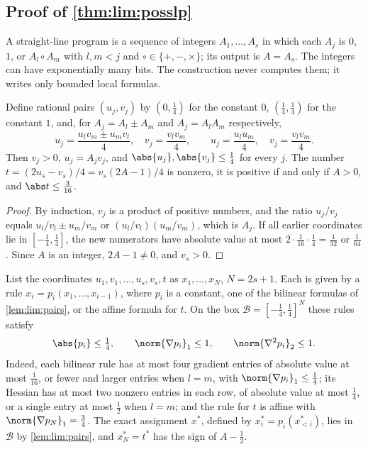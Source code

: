 \subsection{Proof of \texorpdfstring{\cref{thm:lim:posslp}}{the PosSLP theorem}}\label{app:lim:posslp}

A straight-line program is a sequence of integers $A_1,\ldots,A_s$ in which
each $A_j$ is $0$, $1$, or $A_l\circ A_m$ with $l,m<j$ and
$\circ\in\{+,-,\times\}$; its output is $A=A_s$. The integers can have
exponentially many bits. The construction never computes them; it writes
only bounded local formulas.

\begin{lemma}\label{lem:lim:pairs}
Define rational pairs $(u_j,v_j)$ by $(0,\frac14)$ for the constant $0$,
$(\frac14,\frac14)$ for the constant $1$, and, for $A_j=A_l\pm A_m$ and
$A_j=A_lA_m$ respectively,
\[
 u_j=\frac{u_lv_m\pm u_mv_l}4,\quad v_j=\frac{v_lv_m}4,\qquad
 u_j=\frac{u_lu_m}4,\quad v_j=\frac{v_lv_m}4 .
\]
Then $v_j>0$, $u_j=A_jv_j$, and $\abs{u_j},\abs{v_j}\le\frac14$ for every $j$.
The number $t=(2u_s-v_s)/4=v_s(2A-1)/4$ is nonzero, it is positive if and
only if $A>0$, and $\abs t\le\frac3{16}$.
\end{lemma}

\begin{proof}
By induction, $v_j$ is a product of positive numbers, and the ratio
$u_j/v_j$ equals $u_l/v_l\pm u_m/v_m$ or $(u_l/v_l)(u_m/v_m)$, which is
$A_j$. If all
earlier coordinates lie in $[-\frac14,\frac14]$, the new numerators have
absolute value at most $2\cdot\frac1{16}\cdot\frac14=\frac1{32}$ or
$\frac1{64}$. Since $A$ is an integer, $2A-1\ne0$, and $v_s>0$.
\end{proof}

List the coordinates $u_1,v_1,\ldots,u_s,v_s,t$ as $x_1,\ldots,x_N$, $N=2s+1$.
Each is given by a rule $x_i=p_i(x_1,\ldots,x_{i-1})$, where $p_i$ is a
constant, one of the bilinear formulas of \cref{lem:lim:pairs}, or the
affine formula for $t$. On the box $\mathcal B=[-\frac14,\frac14]^N$ these
rules satisfy
\begin{equation}\label{eq:lim:gate-bounds}
 \abs{p_i}\le\tfrac14,\qquad\norm{\nabla p_i}_1\le1,\qquad
 \norm{\nabla^2p_i}_2\le1 .
\end{equation}
Indeed, each bilinear rule has at most four gradient entries of absolute
value at most $\frac1{16}$, or fewer and larger entries when $l=m$, with
$\norm{\nabla p_i}_1\le\frac14$; its Hessian has at most two nonzero entries
in each row, of absolute value at most $\frac14$, or a single entry at most
$\frac12$ when $l=m$; and the rule for $t$ is affine with
$\norm{\nabla p_N}_1=\frac34$. The exact assignment $x^*$, defined by
$x_i^*=p_i(x_{<i}^*)$, lies in $\mathcal B$ by \cref{lem:lim:pairs}, and
$x_N^*=t^*$ has the sign of $A-\frac12$.


